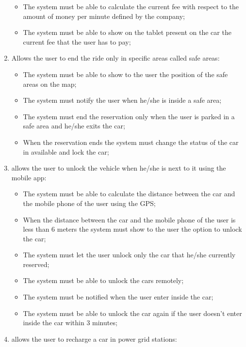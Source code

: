 \begin{enumerate}
\begin{itemize}
	\item The system must be able to calculate the current fee with respect to the amount of money per minute defined by the company;
	\item The system must be able to show on the tablet present on the car the current fee that the user has to pay;
\end{itemize}

\item Allows the user to end the ride only in specific areas called safe areas:

\begin{itemize}
	\item The system must be able to show to the user the position of the safe areas on the map;
	\item The system must notify the user when he/she is inside a safe area;
	\item The system must end the reservation only when the user is parked in a safe area and he/she exits the car;
	\item When the reservation ends the system must change the status of the car in available and lock the car;
\end{itemize}

\item allows the user to unlock the vehicle when he/she is next to it using the mobile app:

\begin{itemize}
	\item The system must be able to calculate the distance between the car and the mobile phone of the user using the GPS;
	\item When the distance between the car and the mobile phone of the user is less than 6 meters the system must show to the user the option to unlock the car;
	\item The system must let the user unlock only the car that he/she currently reserved;
	\item The system must be able to unlock the cars remotely;
	\item The system must be notified when the user enter inside the car;
	\item The system must be able to unlock the car again if the user doesn't enter inside the car within 3 minutes;
\end{itemize}

\item allows the user to recharge a car in power grid stations:


\end{enumerate}
